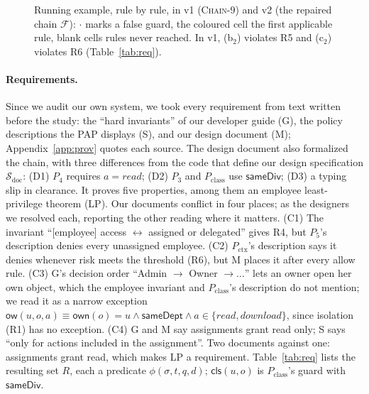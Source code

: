 \documentclass[sigconf,review,anonymous]{acmart}
\newcommand{\chain}{\textsc{Chain-9}\xspace}
\newcommand{\Pc}{P_{\mathrm{class}}}
\newcommand{\Px}{P_{\mathrm{ctx}}}
\newcommand{\ow}{\mathsf{ow}}
\newcommand{\sameDept}{\mathsf{sameDept}}
\newcommand{\sameDiv}{\mathsf{sameDiv}}
\begin{document}
\begin{figure}[t]
\centering\scriptsize\setlength{\tabcolsep}{2.2pt}

\caption{Running example, rule by rule, in v1 (\chain) and v2 (the repaired chain $\mathcal{F}$): $\cdot$ marks a
false guard, the coloured cell the first applicable rule, blank cells rules never reached. In v1, (b$_2$) violates
R5 and (c$_2$) violates R6 (Table~\ref{tab:req}).}
\label{fig:example}
\end{figure}

\paragraph{Requirements.} Since we audit our own system, we took every requirement from text written before the study: the ``hard invariants'' of our developer
guide (G), the policy descriptions the PAP displays (S), and our design document (M); Appendix~\ref{app:prov}
quotes each source. The design document also formalized the chain, with three differences from the code that
define our design specification $\mathcal{S}_{\mathrm{doc}}$: (D1) $P_4$ requires $a=\mathit{read}$; (D2) $P_3$ and
$\Pc$ use $\sameDiv$; (D3) a typing slip in clearance. It proves five properties, among them an employee
least-privilege theorem (LP). Our documents conflict in four places; as the designers we
resolved each, reporting the other reading where it matters. (C1) The invariant ``[employee] access $\leftrightarrow$ assigned or
delegated'' gives R4, but $P_5$'s description denies every unassigned employee. (C2) $\Px$'s description says it
denies whenever risk meets the threshold (R6), but M places it after every allow rule. (C3) G's decision order
``Admin $\to$ Owner $\to\ldots$'' lets an owner open her own object, which the employee invariant and $\Pc$'s
description do not mention; we read it as a narrow exception
$\ow(u,o,a)\equiv\mathsf{own}(o)=u\wedge\sameDept\wedge a\in\{\mathit{read},\mathit{download}\}$, since isolation
(R1) has no exception. (C4) G and M say assignments grant read only; S says ``only for actions included in the
assignment''. Two documents against one: assignments grant read, which makes LP a requirement.
Table~\ref{tab:req} lists the resulting set $R$, each a predicate $\phi(\sigma,t,q,d)$; $\mathsf{cls}(u,o)$ is
$\Pc$'s guard with $\sameDiv$.
\end{document}
